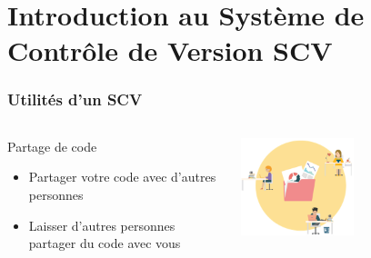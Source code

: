 \documentclass{beamer}
\begin{document}
\section{Introduction au \alert{S}ystème de  \alert{C}ontrôle de \alert{V}ersion \alert{SCV}}

\begin{frame}
\frametitle{Utilités d'un SCV}

\begin{columns}[T]
\begin{column}{.7\textwidth}
\begin{block}{Partage de code}
\begin{itemize}
\item Partager votre code avec d’autres personnes
\item Laisser d’autres personnes partager du code avec vous
\end{itemize}
\end{block}
\end{column}
\begin{column}{.4\textwidth}
\begin{center}
  \includegraphics[width=0.5\textwidth]{../images/travailColaborative.png}
  \end{center}
\end{column}
\end{columns}

\end{frame}
\end{document}
